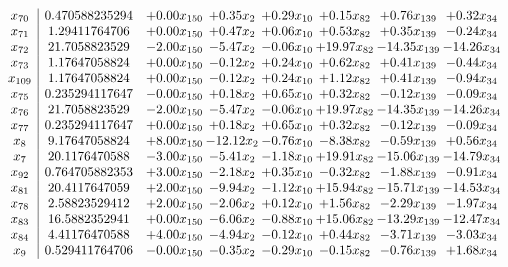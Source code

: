 \documentclass[8pt]{article}
\begin{document}
\[\begin{array}{c| c c@{\hskip 2pt} c@{\hskip 2pt} c@{\hskip 2pt} c@{\hskip 2pt} c@{\hskip 2pt} c@{\hskip 2pt} }
 x_{70}   &  0.470588235294 & +  0.00 x_{150} & +  0.35 x_{2} & +  0.29 x_{10} & +  0.15 x_{82} & +  0.76 x_{139} & +  0.32 x_{34}\\
 x_{71}   &  1.29411764706 & +  0.00 x_{150} & +  0.47 x_{2} & +  0.06 x_{10} & +  0.53 x_{82} & +  0.35 x_{139} & -0.24 x_{34}\\
 x_{72}   &  21.7058823529 & -2.00 x_{150} & -5.47 x_{2} & -0.06 x_{10} & + 19.97 x_{82} & -14.35 x_{139} & -14.26 x_{34}\\
 x_{73}   &  1.17647058824 & +  0.00 x_{150} & -0.12 x_{2} & +  0.24 x_{10} & +  0.62 x_{82} & +  0.41 x_{139} & -0.44 x_{34}\\
 x_{109}   &  1.17647058824 & +  0.00 x_{150} & -0.12 x_{2} & +  0.24 x_{10} & +  1.12 x_{82} & +  0.41 x_{139} & -0.94 x_{34}\\
 x_{75}   &  0.235294117647 & -0.00 x_{150} & +  0.18 x_{2} & +  0.65 x_{10} & +  0.32 x_{82} & -0.12 x_{139} & -0.09 x_{34}\\
 x_{76}   &  21.7058823529 & -2.00 x_{150} & -5.47 x_{2} & -0.06 x_{10} & + 19.97 x_{82} & -14.35 x_{139} & -14.26 x_{34}\\
 x_{77}   &  0.235294117647 & +  0.00 x_{150} & +  0.18 x_{2} & +  0.65 x_{10} & +  0.32 x_{82} & -0.12 x_{139} & -0.09 x_{34}\\
 x_{8}   &  9.17647058824 & +  8.00 x_{150} & -12.12 x_{2} & -0.76 x_{10} & -8.38 x_{82} & -0.59 x_{139} & +  0.56 x_{34}\\
 x_{7}   &  20.1176470588 & -3.00 x_{150} & -5.41 x_{2} & -1.18 x_{10} & + 19.91 x_{82} & -15.06 x_{139} & -14.79 x_{34}\\
 x_{92}   &  0.764705882353 & +  3.00 x_{150} & -2.18 x_{2} & +  0.35 x_{10} & -0.32 x_{82} & -1.88 x_{139} & -0.91 x_{34}\\
 x_{81}   &  20.4117647059 & +  2.00 x_{150} & -9.94 x_{2} & -1.12 x_{10} & + 15.94 x_{82} & -15.71 x_{139} & -14.53 x_{34}\\
 x_{78}   &  2.58823529412 & +  2.00 x_{150} & -2.06 x_{2} & +  0.12 x_{10} & +  1.56 x_{82} & -2.29 x_{139} & -1.97 x_{34}\\
 x_{83}   &  16.5882352941 & +  0.00 x_{150} & -6.06 x_{2} & -0.88 x_{10} & + 15.06 x_{82} & -13.29 x_{139} & -12.47 x_{34}\\
 x_{84}   &  4.41176470588 & +  4.00 x_{150} & -4.94 x_{2} & -0.12 x_{10} & +  0.44 x_{82} & -3.71 x_{139} & -3.03 x_{34}\\
 x_{9}   &  0.529411764706 & -0.00 x_{150} & -0.35 x_{2} & -0.29 x_{10} & -0.15 x_{82} & -0.76 x_{139} & +  1.68 x_{34}\\

\end{array}\]
\end{document}
